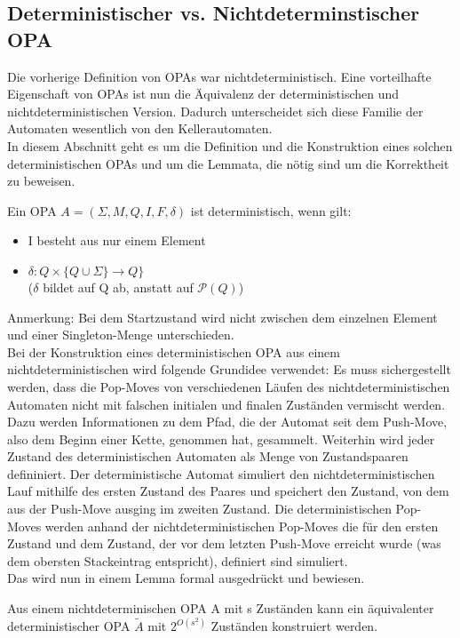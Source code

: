 \subsection{Deterministischer vs. Nichtdeterminstischer OPA}
Die vorherige Definition von OPAs war nichtdeterministisch. Eine vorteilhafte Eigenschaft von OPAs ist nun die Äquivalenz der deterministischen und nichtdeterministischen Version. Dadurch unterscheidet sich diese Familie der Automaten wesentlich von den Kellerautomaten. \\
In diesem Abschnitt geht es um die Definition und die Konstruktion eines solchen deterministischen OPAs und um die Lemmata, die nötig sind um die Korrektheit zu beweisen. \cite{precedence_automata}
\begin{definition}
Ein OPA $A=(\Sigma, M, Q, I, F, \delta)$ ist deterministisch, wenn gilt:
\begin{itemize}
\item
I besteht aus nur einem Element 
\item
$\delta: Q \times \{Q \cup \Sigma\} \rightarrow Q\}$ \\
($\delta$ bildet auf Q ab, anstatt auf $\mathcal{P}(Q)$)
\end{itemize}
\end{definition}
Anmerkung: Bei dem Startzustand wird nicht zwischen dem einzelnen Element und einer Singleton-Menge unterschieden.\\
Bei der Konstruktion eines deterministischen OPA aus einem nichtdeterministischen wird folgende Grundidee verwendet: Es muss sichergestellt werden, dass die Pop-Moves von verschiedenen Läufen des nichtdeterministischen Automaten nicht mit falschen initialen und finalen Zuständen vermischt werden. Dazu werden Informationen zu dem Pfad, die der Automat seit dem Push-Move, also dem Beginn einer Kette, genommen hat, gesammelt. Weiterhin wird jeder Zustand des deterministischen Automaten als Menge von Zustandspaaren defininiert. Der deterministische Automat simuliert den nichtdeterministischen Lauf mithilfe des ersten Zustand des Paares und speichert den Zustand, von dem aus der Push-Move ausging im zweiten Zustand. Die deterministischen Pop-Moves werden anhand  der nichtdeterministischen Pop-Moves die für den ersten Zustand und dem Zustand, der vor dem letzten Push-Move erreicht wurde (was dem obersten Stackeintrag entspricht), definiert sind simuliert.\\
Das wird nun in einem Lemma formal ausgedrückt und bewiesen.
\begin{lemma}
\label{lemma_Deter}
Aus einem nichtdeterminischen OPA A mit s Zuständen kann ein äquivalenter deterministischer OPA $\tilde{A}$ mit $2^{O(s^2)}$ Zuständen konstruiert werden.
\end{lemma}
